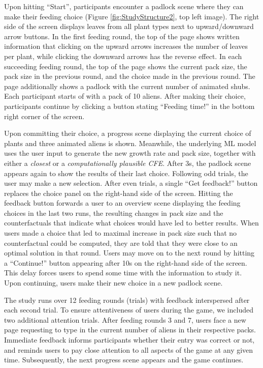 Upon hitting ``Start'', participants encounter a padlock scene where they can make their feeding choice (Figure \ref{fig:StudyStructure2}, top left image).
The right side of the screen displays leaves from all plant types next to upward/downward arrow buttons. 
In the first feeding round, the top of the page shows written information that clicking on the upward arrows increases the number of leaves per plant, while clicking the downward arrows has the reverse effect.
In each succeeding feeding round, the top of the page shows the current pack size, the pack size in the previous round, and the choice made in the previous round.
The page additionally shows a padlock with the current number of animated shubs.
Each participant starts of with a pack of 10 aliens.
After making their choice, participants continue by clicking a button stating ``Feeding time!'' in the bottom right corner of the screen.

Upon committing their choice, a progress scene displaying the current choice of plants and three animated aliens is shown. 
Meanwhile, the underlying \gls{ML} model uses the user input to generate the new growth rate and pack size, together with either a \textit{closest} or a \textit{computationally plausible \gls{CFE}}.
After 3s, the padlock scene appears again to show the results of their last choice. 
Following odd trials, the user may make a new selection. 
After even trials, a single ``Get feedback!'' button replaces the choice panel on the right-hand side of the screen.
Hitting the feedback button forwards a user to an overview scene displaying the feeding choices in the last two runs, the resulting changes in pack size and the counterfactuals that indicate what choices would have led to better results. 
When users made a choice that led to maximal increase in pack size such that no counterfactual could be computed, they are told that they were close to an optimal solution in that round. 
Users may move on to the next round by hitting a ``Continue!'' button appearing after 10s on the right-hand side of the screen. This delay forces users to spend some time with the information to study it. Upon continuing, users make their new choice in a new padlock scene.

The study runs over 12 feeding rounds (trials) with feedback interspersed after each second trial. 
To ensure attentiveness of users during the game, we included two additional attention trials.
After feeding rounds 3 and 7, users face a new page requesting to type in the current number of aliens in their respective packs.
Immediate feedback informs participants whether their entry was correct or not, and reminds users to pay close attention to all aspects of the game at any given time.
Subsequently, the next progress scene appears and the game continues. 

